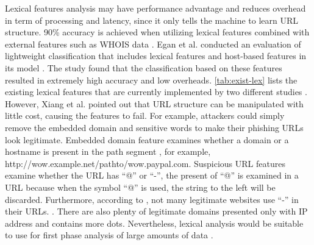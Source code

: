 Lexical features analysis may have performance advantage and reduces
overhead in term of processing and latency, since it only tells the
machine to learn URL structure. 90\% accuracy is achieved when utilizing
lexical features combined with external features such as WHOIS data
\citep{le:2011}. Egan et al. conducted an evaluation of lightweight
classification that includes lexical features and host-based features
in its model \citep{egan:2011}. The study found that the classification
based on these features resulted in extremely high accuracy and low
overheads. \autoref{tab:exist-lex} lists the existing lexical features
that are currently implemented by two different studies \citep{xiang:2011,liu}.
However, Xiang et al.\citep{xiang:2011} pointed out that URL structure
can be manipulated with little cost, causing the features to fail.
For example, attackers could simply remove the embedded domain and
sensitive words to make their phishing URLs look legitimate. Embedded
domain feature examines whether a domain or a hostname is present
in the path segment \citep{xiang:2011}, for example, http://wow.example.net/pathto/wow.paypal.com.
Suspicious URL features examine whether the URL has ``@'' or ``-'',
the present of ``@'' is examined in a URL because when the symbol
``@'' is used, the string to the left will be discarded. Furthermore,
according to \citep{xiang:2011}, not many legitimate websites use
``-'' in their URLs. . There are also plenty of legitimate domains
presented only with IP address and contains more dots. Nevertheless,
lexical analysis would be suitable to use for first phase analysis
of large amounts of data \citep{egan:2011}.

